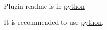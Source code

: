 Plugin readme is in \hyperlink{md_src_plugins_python_README_src_plugins_python_README_md}{python}

It is recommended to use \hyperlink{md_src_plugins_python_README_src_plugins_python_README_md}{python}. 